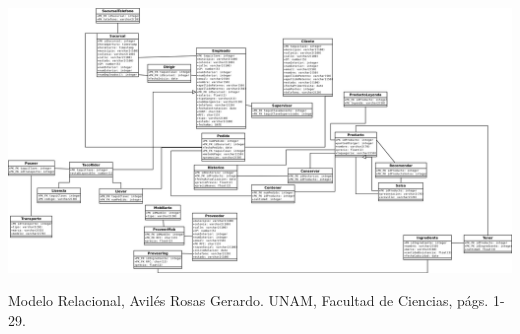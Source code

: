 \documentclass[11pt,letterpaper]{article}
\begin{document}
\newpage
\begin{landscape}

\begin{center}
\begin{minipage}{.8\linewidth}
\includegraphics[scale=0.22]{UML_no_normalizado.png}
\end{minipage}
\end{center}

\end{landscape}
 \begin{thebibliography}{1}


Modelo Relacional, Avilés Rosas Gerardo. UNAM, Facultad de Ciencias,
págs. 1-29.

  \end{thebibliography}
\end{document}
